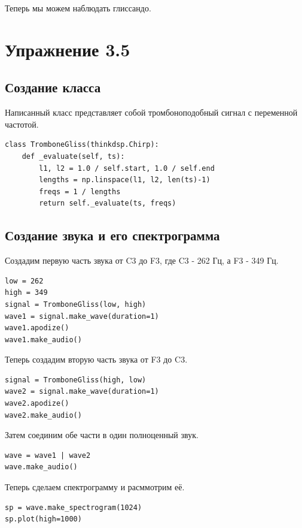 \documentclass[a4paper,12pt]{report}
\begin{document}
Теперь мы можем наблюдать глиссандо.

\chapter{Упражнение 3.5}
\section{Создание класса}

Написанный класс представляет собой тромбоноподобный сигнал с переменной частотой.

\begin{lstlisting}[caption=Создание класса]
class TromboneGliss(thinkdsp.Chirp):
    def _evaluate(self, ts):
        l1, l2 = 1.0 / self.start, 1.0 / self.end
        lengths = np.linspace(l1, l2, len(ts)-1)
        freqs = 1 / lengths
        return self._evaluate(ts, freqs)
\end{lstlisting}

\section{Создание звука и его спектрограмма}

Создадим первую часть звука от C3 до F3, где C3 - 262 Гц, а F3 - 349 Гц.

\begin{lstlisting}[caption=Создание первой части звука]
low = 262
high = 349
signal = TromboneGliss(low, high)
wave1 = signal.make_wave(duration=1)
wave1.apodize()
wave1.make_audio()
\end{lstlisting}

Теперь создадим вторую часть звука от F3 до C3.

\begin{lstlisting}[caption=Создание второй части звука]
signal = TromboneGliss(high, low)
wave2 = signal.make_wave(duration=1)
wave2.apodize()
wave2.make_audio()
\end{lstlisting}

Затем соединим обе части в один полноценный звук.

\begin{lstlisting}[caption=Соединение двух частей звука]
wave = wave1 | wave2
wave.make_audio()
\end{lstlisting}

Теперь сделаем спектрограмму и расммотрим её.

\begin{lstlisting}[caption=Спектрограмма звука]
sp = wave.make_spectrogram(1024)
sp.plot(high=1000)
\end{lstlisting}
\end{document}
